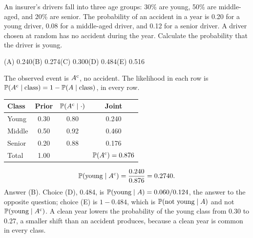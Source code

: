 \begin{example}
An insurer's drivers fall into three age groups: 30\% are young, 50\% are middle-aged, and
20\% are senior. The probability of an accident in a year is 0.20 for a young driver, 0.08
for a middle-aged driver, and 0.12 for a senior driver. A driver chosen at random has no
accident during the year. Calculate the probability that the driver is young.
\par\smallskip\noindent (A) 0.240\qquad (B) 0.274\qquad (C) 0.300\qquad (D) 0.484\qquad (E) 0.516
\end{example}
\begin{solution}
The observed event is $A^{\mathrm{c}}$, no accident. The likelihood in each row is
$\mathbb{P}(A^{\mathrm{c}} \mid \text{class}) = 1 - \mathbb{P}(A \mid \text{class})$, in every row.
\begin{center}
\begin{tabular}{@{}lccc@{}}
\toprule
Class & Prior & $\mathbb{P}(A^{\mathrm{c}} \mid \cdot)$ & Joint \\
\midrule
Young  & 0.30 & 0.80 & 0.240 \\
Middle & 0.50 & 0.92 & 0.460 \\
Senior & 0.20 & 0.88 & 0.176 \\
\midrule
Total  & 1.00 & & $\mathbb{P}(A^{\mathrm{c}}) = 0.876$ \\
\bottomrule
\end{tabular}
\end{center}
\[
\mathbb{P}(\text{young} \mid A^{\mathrm{c}}) = \frac{0.240}{0.876} = 0.2740.
\]
Answer (B). Choice (D), 0.484, is $\mathbb{P}(\text{young} \mid A) = 0.060/0.124$, the answer to
the opposite question; choice (E) is $1 - 0.484$, which is $\mathbb{P}(\text{not young} \mid A)$
and not $\mathbb{P}(\text{young} \mid A^{\mathrm{c}})$. A clean year lowers the probability of the young
class from 0.30 to 0.27, a smaller shift than an accident produces, because a clean year is
common in every class.
\end{solution}

